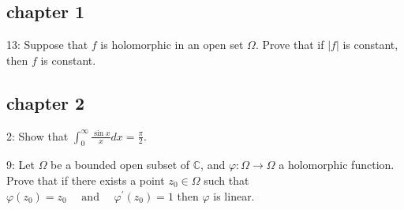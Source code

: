 \documentclass{article}
\begin{document}
\subsection*{chapter 1}
13: Suppose that $f$ is holomorphic in an open set $\Omega$. Prove that if $|f|$ is constant, then $f$ is constant. 

\subsection*{chapter 2}
2: Show that $\int_{0}^{\infty} \frac{\sin x}{x} d x=\frac{\pi}{2}$.

9: Let $\Omega$ be a bounded open subset of $\mathbb{C}$, and $\varphi: \Omega \rightarrow \Omega$ a holomorphic function. Prove that if there exists a point $z_{0} \in \Omega$ such that $\varphi\left(z_{0}\right)=z_{0} \quad \text { and } \quad \varphi^{\prime}\left(z_{0}\right)=1$ then $\varphi$ is linear.
\end{document}
